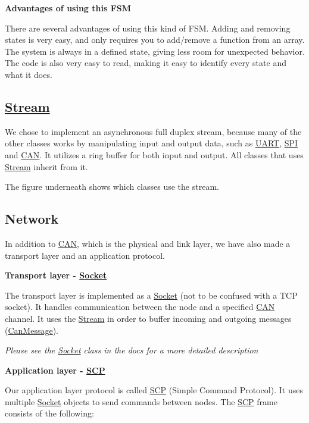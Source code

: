 {\bfseries Advantages of using this F\+SM}

There are several advantages of using this kind of F\+SM. Adding and removing states is very easy, and only requires you to add/remove a function from an array. The system is always in a defined state, giving less room for unexpected behavior. The code is also very easy to read, making it easy to identify every state and what it does.

\subsection*{\hyperlink{class_stream}{Stream}}

We chose to implement an asynchronous full duplex stream, because many of the other classes works by manipulating input and output data, such as \hyperlink{class_u_a_r_t}{U\+A\+RT}, \hyperlink{namespace_s_p_i}{S\+PI} and \hyperlink{class_c_a_n}{C\+AN}. It utilizes a ring buffer for both input and output. All classes that uses \hyperlink{class_stream}{Stream} inherit from it.

The figure underneath shows which classes use the stream.



\subsection*{Network}

In addition to \hyperlink{class_c_a_n}{C\+AN}, which is the physical and link layer, we have also made a transport layer and an application protocol.

{\bfseries Transport layer -\/ \hyperlink{class_socket}{Socket}}

The transport layer is implemented as a \hyperlink{class_socket}{Socket} (not to be confused with a T\+CP socket). It handles communication between the node and a specified \hyperlink{class_c_a_n}{C\+AN} channel. It uses the \hyperlink{class_stream}{Stream} in order to buffer incoming and outgoing messages (\hyperlink{struct_can_message}{Can\+Message}).

{\itshape Please see the \hyperlink{class_socket}{Socket} class in the docs for a more detailed description}

{\bfseries Application layer -\/ \hyperlink{class_s_c_p}{S\+CP}}

Our application layer protocol is called \hyperlink{class_s_c_p}{S\+CP} (Simple Command Protocol). It uses multiple \hyperlink{class_socket}{Socket} objects to send commands between nodes. The \hyperlink{class_s_c_p}{S\+CP} frame consists of the following\+:


